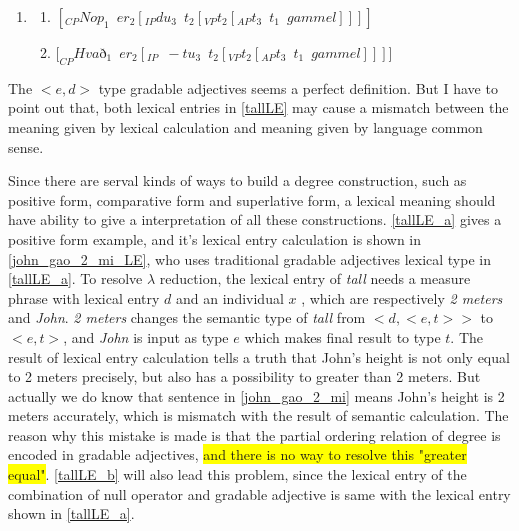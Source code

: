 \documentclass{ctexart}
\begin{document}
\begin{enumerate}[resume]
    \item \label{Icelandic_example_LE}
    
    \begin{enumerate}[ref=(\arabic{enumi}\alph*)]
        \item $[_{CP}Nop_1 \enspace er_2[_{IP}du_3 \enspace t_2[_{VP} t_2[_{AP} t_3 \enspace t_1 \enspace gammel]]]]$
        
        \item $[_{CP}Hva$ð$_1 \enspace er_2[_{IP} \enspace -tu_3 \enspace t_2 [_{VP}t_2[_{AP}t_3 \enspace t_1 \enspace gammel]]]]$
        
    \end{enumerate}   
    
\end{enumerate}

The $<e,d>$ type gradable adjectives seems a perfect definition. But I have to point out that, both lexical entries in \ref{tallLE} may cause a mismatch between the meaning given by lexical calculation and meaning given by language common sense. 

Since there are serval kinds of ways to build a degree construction, such as positive form, comparative form and superlative form, a lexical meaning should have ability to give a interpretation of all these constructions. \ref{tallLE_a} gives a positive form example, and it's lexical entry calculation is shown in \ref{john_gao_2_mi_LE}, who uses traditional gradable adjectives lexical type in \ref{tallLE_a}. To resolve $\lambda$ reduction, the lexical entry of \textit{tall} needs a measure phrase with lexical entry $d$ and an individual $x$ , which are respectively \textit{2 meters} and \textit{John}. \textit{2 meters} changes the semantic type of \textit{tall} from $<d,<e,t>>$ to $<e,t>$, and \textit{John} is input as type $e$ which makes final result to type $t$. The result of lexical entry calculation tells a truth that John's height is not only equal to 2 meters precisely, but also has a possibility to greater than 2 meters. But actually we do know that sentence in \ref{john_gao_2_mi} means John's height is 2 meters accurately, which is mismatch with the result of semantic calculation. The reason why this mistake is made is that the partial ordering relation of degree is encoded in gradable adjectives, \colorbox{yellow}{and there is no way to resolve this "greater equal"}. \ref{tallLE_b} will also lead this problem, since the lexical entry of the combination of null operator and gradable adjective is same with the lexical entry shown in \ref{tallLE_a}.
\end{document}

